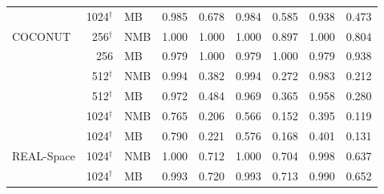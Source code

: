 \begin{table}[htbp]
\begin{tabular}{@{}l r l r r r r r r@{}}
     & 1024$^{\dagger}$ & MB & 0.985 & 0.678 & 0.984 & 0.585 & 0.938 & 0.473 \\
    \addlinespace
    COCONUT & 256$^{\dagger}$ & NMB & 1.000 & 1.000 & 1.000 & 0.897 & 1.000 & 0.804 \\
     & 256 & MB & 0.979 & 1.000 & 0.979 & 1.000 & 0.979 & 0.938 \\
     & 512$^{\dagger}$ & NMB & 0.994 & 0.382 & 0.994 & 0.272 & 0.983 & 0.212 \\
     & 512$^{\dagger}$ & MB & 0.972 & 0.484 & 0.969 & 0.365 & 0.958 & 0.280 \\
     & 1024$^{\dagger}$ & NMB & 0.765 & 0.206 & 0.566 & 0.152 & 0.395 & 0.119 \\
     & 1024$^{\dagger}$ & MB & 0.790 & 0.221 & 0.576 & 0.168 & 0.401 & 0.131 \\
    \addlinespace
    REAL-Space & 1024$^{\dagger}$ & NMB & 1.000 & 0.712 & 1.000 & 0.704 & 0.998 & 0.637 \\
     & 1024$^{\dagger}$ & MB & 0.993 & 0.720 & 0.993 & 0.713 & 0.990 & 0.652 \\
    \bottomrule
  \end{tabular}
\end{table}
